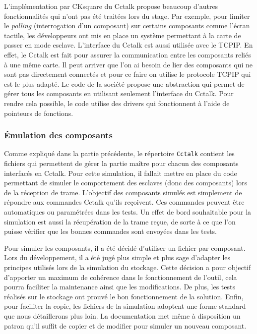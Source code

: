 \documentclass[a4paper]{article}
\begin{document}
L'implémentation par CKsquare du Cctalk propose beaucoup d'autres
fonctionnalités qui n'ont pas été traitées lors du stage. Par exemple, pour
limiter le \textit{polling} (interrogation d'un composant) sur certains
composants comme l'écran tactile, les développeurs ont mis en place un système
permettant à la carte de passer en mode esclave. L'interface du Cctalk est aussi
utilisée avec le TCPIP. En effet, le Cctalk est fait pour assurer la
communication entre les composants reliés à une même carte. Il peut arriver que
l'on ai besoin de lier des composants qui ne sont pas directement connectés et
pour ce faire on utilise le protocole TCPIP qui est le plus adapté. Le code de
la société propose une abstraction qui permet de gérer tous les composants en
utilisant seulement l'interface du Cctalk. Pour rendre cela possible, le code
utilise des drivers qui fonctionnent à l'aide de pointeurs de fonctions.

\subsubsection{Émulation des composants}

Comme expliqué dans la partie précédente, le répertoire \verb|Cctalk| contient
les fichiers qui permettent de gérer la partie maître pour chacun des
composants interfacés en Cctalk. Pour cette simulation, il fallait mettre en
place du code permettant de simuler le comportement des esclaves (donc des
composants) lors de la réception de trame. L'objectif des composants simulés est
simplement de répondre aux commandes Cctalk qu'ils reçoivent. Ces commandes
peuvent être automatiques ou paramétrées dans les tests. Un effet de bord
souhaitable pour la simulation est aussi la récupération de la trame reçue, de
sorte à ce que l'on puisse vérifier que les bonnes commandes sont envoyées dans
les tests.

Pour simuler les composants, il a été décidé d'utiliser un fichier par
composant. Lors du développement, il a été jugé plus simple et plus sage
d'adapter les principes utilisés lors de la simulation du stockage. Cette
décision a pour objectif d'apporter un maximum de cohérence dans le
fonctionnement de l'outil, cela pourra faciliter la maintenance ainsi que les
modifications. De plus, les tests réalisés sur le stockage ont prouvé le bon
fonctionnement de la solution. Enfin, pour faciliter la copie, les fichiers de
la simulation adoptent une forme standard que nous détaillerons plus loin. La
documentation met même à disposition un patron qu'il suffit de copier et de
modifier pour simuler un nouveau composant.
\end{document}
